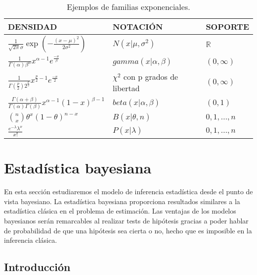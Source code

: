 \documentclass{article}
\newcommand{\importsection}[1]{}           %
\begin{document}
    \begin{table}[H]
    	\begin{center}
    		\begin{tabular}{|l|l|l|}
    			\hline
    			DENSIDAD & NOTACIÓN & SOPORTE\\
    			\hline \hline
                $\frac{1}{\sqrt{2 \pi} \sigma} \exp\left(- \frac{(x-\mu)^2}{2\sigma^2}\right)$ & $N(x|\mu, \sigma^2)$ & $\mathbb{R}$ \\
                \hline
                $\frac{1}{\Gamma(\alpha)\beta^\alpha}x^{\alpha - 1}e^{\frac{-x}{\beta}}$ & $ gamma(x|\alpha,\beta)$ &   $(0,\infty)  $\\ \hline
    			$\frac{1}{\Gamma(\frac{p}{2})2^{\frac{p}{2}}}x^{\frac{p}{2} - 1}e^{\frac{-x}{2}}$ & $\chi^2$ con p grados de libertad  & $(0,\infty)  $ \\ \hline
    			$\frac{\Gamma(\alpha + \beta)}{\Gamma(\alpha) \Gamma(\beta)} x ^{\alpha - 1}(1-x)^{\beta - 1}$ &  $beta(x| \alpha, \beta)$   &   $(0,1)$   \\ \hline
    			$\binom{n}{x} \theta ^x (1-\theta)^{n-x}$ &  $B(x|\theta, n)$ & ${0,1, \ldots , n}$   \\ \hline
    			$\frac{e^{-\lambda} \lambda^x}{x!}$ & $P(x|\lambda)$ & ${0,1, \ldots , n}$   \\ \hline
    		\end{tabular}
    	\end{center}
        \caption{Ejemplos de familias exponenciales.}
        \label{table:exponencial}
    \end{table}

\pagebreak
\importsection{Hipotesis.tex}

\pagebreak

\section{Estadística bayesiana} \label{sec:bayes}

En esta sección estudiaremos el modelo de inferencia estadística desde el punto de vista bayesiano. La estadística bayesiana proporciona resultados similares a la estadística clásica en el problema de estimación. Las ventajas de los modelos bayesianos serán remarcables al realizar tests de hipótesis gracias a poder hablar de probabilidad de que una hipótesis sea cierta o no, hecho que es imposible en la inferencia clásica.

\subsection{Introducción}
\end{document}
